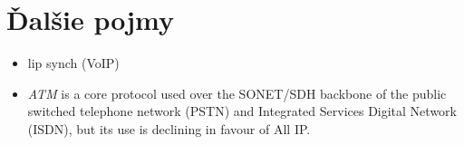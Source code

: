 \documentclass[10pt,a4paper]{article}
\begin{document}
\section{Ďalšie pojmy}
\begin{itemize}
\item lip synch (VoIP)                                  
\item \emph{ATM} is a core protocol used over the SONET/SDH backbone of the public switched telephone network (PSTN) and Integrated Services Digital Network (ISDN), but its use is declining in favour of All IP. 
\end{itemize}
\end{document}
